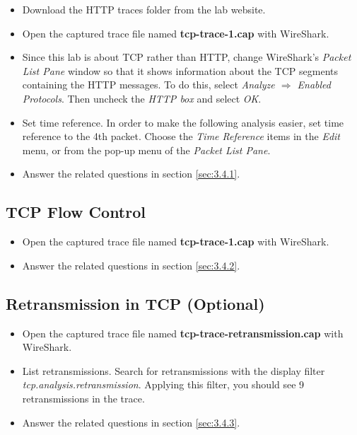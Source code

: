 \begin{itemize}
  \item Download the HTTP traces folder from the lab website.
  \item Open the captured trace file named \textbf{tcp-trace-1.cap}
    with WireShark.
  \item Since this lab is about TCP rather than HTTP, change
    WireShark's {\em Packet List Pane} window so that it shows
    information about the TCP segments containing the HTTP messages.
    To do this, select {\em Analyze $\Rightarrow$ Enabled Protocols}.
    Then uncheck the {\em HTTP box} and select {\em OK}.
  \item Set time reference. In order to make the following analysis
    easier, set time reference to the 4th packet. Choose the {\em Time
      Reference} items in the {\em Edit} menu, or from the pop-up menu
    of the {\em Packet List Pane}.
  \item Answer the related questions in section \ref{sec:3.4.1}.
\end{itemize}

\subsection{TCP Flow Control}\label{sec:3.3.2}

\begin{itemize}
\item Open the captured trace file named {\bf tcp-trace-1.cap} with
  WireShark.
\item Answer the related questions in section \ref{sec:3.4.2}.
\end{itemize}

\subsection{Retransmission in TCP (Optional)}\label{sec:3.3.3}

\begin{itemize}
\item Open the captured trace file named
  \textbf{tcp-trace-retransmission.cap} with WireShark.
\item List retransmissions. Search for retransmissions with the
  display filter \emph{tcp.analysis.retransmission}. Applying this
  filter, you should see 9 retransmissions in the trace.
\item Answer the related questions in section \ref{sec:3.4.3}.
\end{itemize}

